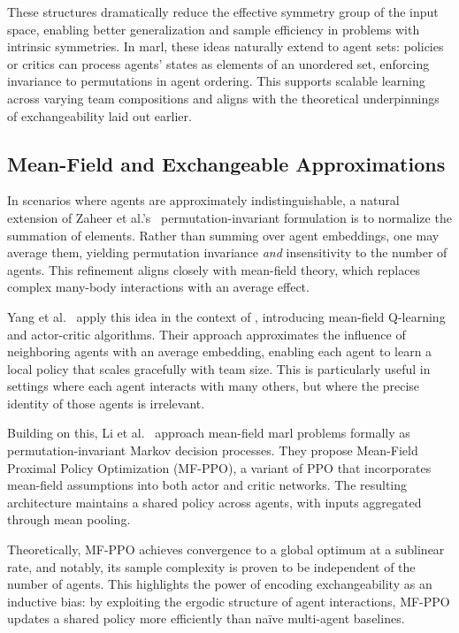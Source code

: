 \documentclass{article}
\begin{document}
These structures dramatically reduce the effective symmetry 
group of the input space, enabling better generalization and 
sample efficiency in problems with intrinsic symmetries. 
In \gls{marl}, these ideas naturally extend to agent sets: 
policies or critics can process agents' states as elements 
of an unordered set, enforcing invariance to permutations in agent ordering. 
This supports scalable learning across varying team compositions 
and aligns with the theoretical underpinnings of exchangeability laid out earlier.


\subsection{Mean-Field and Exchangeable Approximations}

In scenarios where agents are approximately indistinguishable, 
a natural extension of Zaheer et al.'s~\cite{zaheer2017} 
permutation-invariant formulation is to normalize the summation of elements. 
Rather than summing over agent embeddings, one may average them,
yielding permutation invariance \emph{and} insensitivity to the number of agents. 
This refinement aligns closely with mean-field theory, which replaces complex 
many-body interactions with an average effect.

Yang et al.~\cite{yang2018} apply this idea in the context of , 
introducing mean-field Q-learning and actor-critic algorithms. 
Their approach approximates the influence of neighboring agents with 
an average embedding, enabling each agent to learn a local policy that 
scales gracefully with team size. This is particularly 
useful in settings where each agent interacts with many others, 
but where the precise identity of those agents is irrelevant.

Building on this, Li et al.~\cite{li2021b} approach mean-field \gls{marl} 
problems formally as permutation-invariant Markov decision processes. 
They propose Mean-Field Proximal Policy Optimization (MF-PPO), 
a variant of PPO that incorporates mean-field assumptions into 
both actor and critic networks. The resulting architecture maintains a 
shared policy across agents, with inputs aggregated through mean pooling.

Theoretically, MF-PPO achieves convergence to a global optimum at 
a sublinear rate, and notably, its sample complexity is proven to be 
independent of the number of agents. This highlights the power of 
encoding exchangeability as an inductive bias: by exploiting the 
ergodic structure of agent interactions, MF-PPO updates a shared policy 
more efficiently than na\"ive multi-agent baselines.
\end{document}
